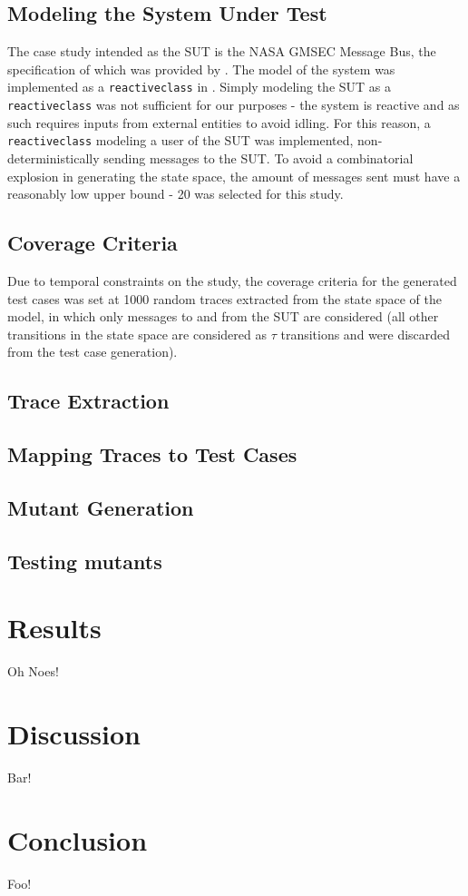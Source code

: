 \documentclass{article}
\begin{document}
	\subsection{Modeling the System Under Test}
	The case study intended as the SUT is the NASA GMSEC Message Bus, the specification of which was provided by \citeauthor{fraunhofer}. The model of the system was implemented as a \texttt{reactiveclass} in \Rebeca. Simply modeling the SUT as a \texttt{reactiveclass} was not sufficient for our purposes \-- the system is reactive and as such requires inputs from external entities to avoid idling. For this reason, a \texttt{reactiveclass} modeling a user of the SUT was implemented, non-deterministically sending messages to the SUT. To avoid a combinatorial explosion in generating the state space, the amount of messages sent must have a reasonably low upper bound \-- 20 was selected for this study.

	\subsection{Coverage Criteria}
	Due to temporal constraints on the study, the coverage criteria for the generated test cases was set at 1000 random traces extracted from the state space of the model, in which only messages to and from the SUT are considered (all other transitions in the state space are considered as $\tau$ transitions and were discarded from the test case generation).

	\subsection{Trace Extraction}


	\subsection{Mapping Traces to Test Cases}


	\subsection{Mutant Generation}


	\subsection{Testing mutants}
		

\section{Results}
	Oh Noes!

\section{Discussion}
	Bar!

\section{Conclusion}
	Foo!


\end{document}
